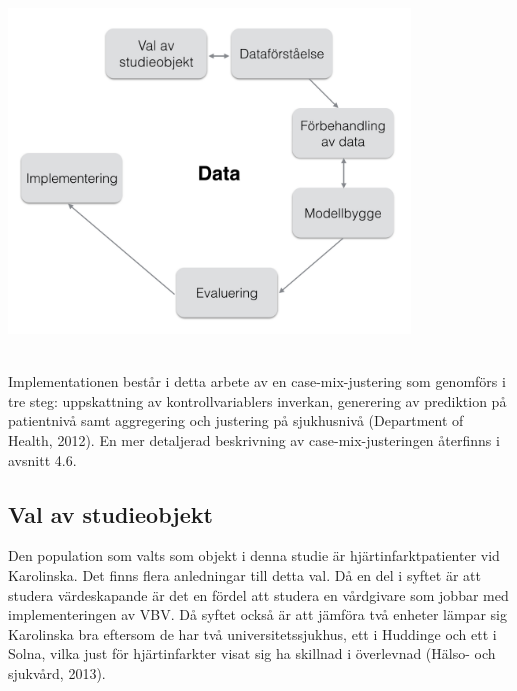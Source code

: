 \noindent\begin{minipage}{\textwidth}
\centering
\includegraphics[width=0.8\textwidth]{Data.png}
\label{fig:design}            
\end{minipage}
\\

Implementationen består i detta arbete av en case-mix-justering som genomförs i tre steg: uppskattning av kontrollvariablers inverkan, generering av prediktion på patientnivå samt aggregering och justering på sjukhusnivå (Department of Health, 2012). En mer detaljerad beskrivning av case-mix-justeringen återfinns i avsnitt 4.6.

\subsection{Val av studieobjekt}

Den population som valts som objekt i denna studie är hjärtinfarktpatienter vid Karolinska. Det finns flera anledningar till detta val. Då en del i syftet är att studera värdeskapande är det en fördel att studera en vårdgivare som jobbar med implementeringen av VBV. Då syftet också är att jämföra två enheter lämpar sig Karolinska bra eftersom de har två universitetssjukhus, ett i Huddinge och ett i Solna, vilka just för hjärtinfarkter visat sig ha skillnad i överlevnad (Hälso- och sjukvård, 2013).

